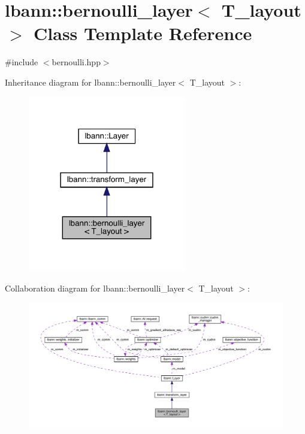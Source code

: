 \hypertarget{classlbann_1_1bernoulli__layer}{}\section{lbann\+:\+:bernoulli\+\_\+layer$<$ T\+\_\+layout $>$ Class Template Reference}
\label{classlbann_1_1bernoulli__layer}


{\ttfamily \#include $<$bernoulli.\+hpp$>$}



Inheritance diagram for lbann\+:\+:bernoulli\+\_\+layer$<$ T\+\_\+layout $>$\+:\nopagebreak
\begin{figure}[H]
\begin{center}
\leavevmode
\includegraphics[width=195pt]{classlbann_1_1bernoulli__layer__inherit__graph}
\end{center}
\end{figure}


Collaboration diagram for lbann\+:\+:bernoulli\+\_\+layer$<$ T\+\_\+layout $>$\+:\nopagebreak
\begin{figure}[H]
\begin{center}
\leavevmode
\includegraphics[width=350pt]{classlbann_1_1bernoulli__layer__coll__graph}
\end{center}
\end{figure}
